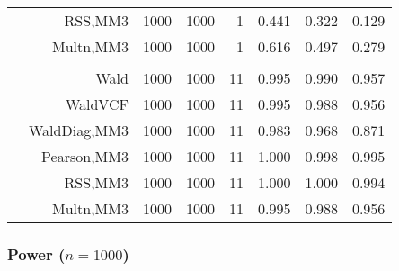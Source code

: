 \documentclass[
]{article}
\begin{document}
\begin{table}[H]
{\begin{tabular}[t]{lrrrrrrr}
\hspace{1em} & RSS,MM3 & 1000 & 1000 & 1 & 0.441 & 0.322 & 0.129\\

\hspace{1em} & Multn,MM3 & 1000 & 1000 & 1 & 0.616 & 0.497 & 0.279\\
\cmidrule{1-8}
\addlinespace[0.3em]
\multicolumn{8}{l}{\textbf{3F 15V}}\\
\hspace{1em} & Wald & 1000 & 1000 & 11 & 0.995 & 0.990 & 0.957\\

\hspace{1em} & WaldVCF & 1000 & 1000 & 11 & 0.995 & 0.988 & 0.956\\

\hspace{1em} & WaldDiag,MM3 & 1000 & 1000 & 11 & 0.983 & 0.968 & 0.871\\

\hspace{1em} & Pearson,MM3 & 1000 & 1000 & 11 & 1.000 & 0.998 & 0.995\\

\hspace{1em} & RSS,MM3 & 1000 & 1000 & 11 & 1.000 & 1.000 & 0.994\\

\hspace{1em} & Multn,MM3 & 1000 & 1000 & 11 & 0.995 & 0.988 & 0.956\\
\bottomrule
\end{tabular}}
\endgroup{}
\end{table}

\hypertarget{power-n1000}{%
\subsubsection{\texorpdfstring{Power
(\(n=1000\))}{Power (n=1000)}}\label{power-n1000}}
\end{document}
